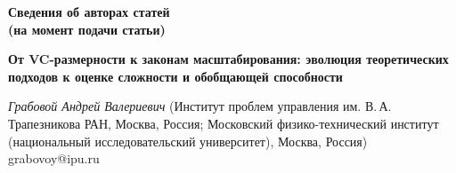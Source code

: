 \clearpage
{}
\markboth{}{}
\begingroup
\begin{center}
\Large \bfseries Сведения об авторах статей\\
\normalsize (на момент подачи статьи)
\end{center}

\newcommand{\auth}[3]{\noindent\parbox{\textwidth}{%
{\itshape #1} (#2) #3\par}}

\newcommand{\tit}[1]{\noindent\parbox{\textwidth}{%
\raggedright\bfseries #1 \par}\vspace{1pt}}

\small

\tit{От VC-размерности к законам масштабирования: эволюция теоретических подходов к оценке сложности и обобщающей способности}
\auth{Грабовой Андрей Валериевич}{Институт проблем управления им. В.\,А. Трапезникова РАН, Москва, Россия; Московский физико-технический институт (национальный исследовательский университет), Москва, Россия}{grabovoy@ipu.ru}

\endgroup
